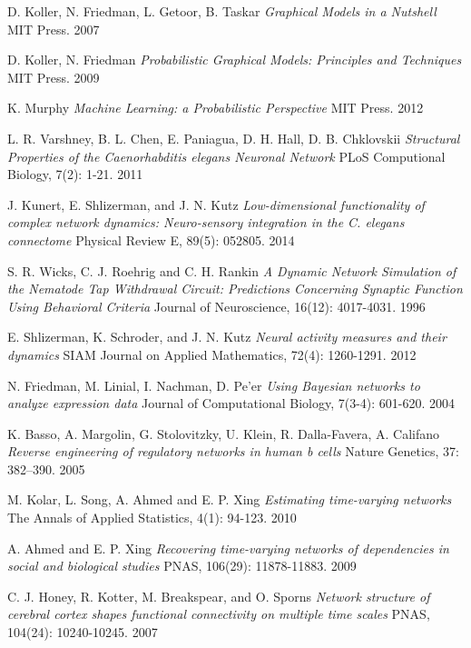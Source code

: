 \documentclass[letterpaper,11pt]{article}
\begin{document}
\begin{thebibliography}{9}

D. Koller, N. Friedman, L. Getoor, B. Taskar
\textit{Graphical Models in a Nutshell}
MIT Press. 2007

D. Koller, N. Friedman
\textit{Probabilistic Graphical Models: Principles and Techniques}
MIT Press. 2009

K. Murphy
\textit{Machine Learning: a Probabilistic Perspective}
MIT Press. 2012

L. R. Varshney, B. L. Chen, E. Paniagua, D. H. Hall, D. B. Chklovskii 
\textit{Structural Properties of the Caenorhabditis elegans Neuronal Network}
PLoS Computional Biology, 7(2): 1-21. 2011

J. Kunert, E. Shlizerman, and J. N. Kutz
\textit{Low-dimensional functionality of complex network dynamics: Neuro-sensory integration in the C. elegans connectome}
Physical Review E, 89(5): 052805. 2014

S. R. Wicks, C. J. Roehrig and C. H. Rankin
\textit{A Dynamic Network Simulation of the Nematode Tap Withdrawal Circuit: Predictions Concerning Synaptic Function Using Behavioral Criteria}
Journal of Neuroscience, 16(12): 4017-4031. 1996

E. Shlizerman, K. Schroder, and J. N. Kutz
\textit{Neural activity measures and their dynamics}
SIAM Journal on Applied Mathematics, 72(4): 1260-1291. 2012

N. Friedman, M. Linial, I. Nachman, D. Pe'er
\textit{Using Bayesian networks to analyze expression data}
Journal of Computational Biology, 7(3-4): 601-620. 2004

K. Basso, A. Margolin, G. Stolovitzky, U. Klein, R. Dalla-Favera, A. Califano
\textit{Reverse engineering of regulatory networks in human b cells}
Nature Genetics, 37: 382–390. 2005

M. Kolar, L. Song, A. Ahmed and E. P. Xing
\textit{Estimating time-varying networks}
The Annals of Applied Statistics, 4(1): 94-123. 2010

A. Ahmed and E. P. Xing
\textit{Recovering time-varying networks of dependencies in social and biological studies}
PNAS, 106(29): 11878-11883. 2009

C. J. Honey, R. Kotter, M. Breakspear, and O. Sporns
\textit{Network structure of cerebral cortex shapes functional connectivity on multiple time scales}
PNAS, 104(24): 10240-10245. 2007 


\end{thebibliography}
\end{document}
